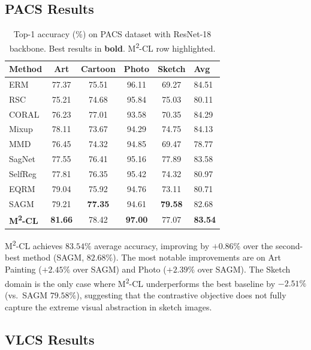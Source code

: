 \documentclass[12pt,a4paper]{article}
\newcommand{\tablehl}{\rowcolor{LightBlue!50}}
\begin{document}
\subsection{PACS Results}

\begin{table}[H]
  \centering
  \caption{Top-1 accuracy (\%) on PACS dataset with ResNet-18 backbone.
  Best results in \textbf{bold}. M\textsuperscript{2}-CL row highlighted.}
  \label{tab:pacs}
  \begin{tabular}{@{}lccccC{1.3cm}@{}}
    \toprule
    \textbf{Method} & \textbf{Art} & \textbf{Cartoon} & \textbf{Photo}
      & \textbf{Sketch} & \textbf{Avg} \\
    \midrule
    ERM       & 77.37 & 75.51 & 96.11 & 69.27 & 84.51 \\
    RSC       & 75.21 & 74.68 & 95.84 & 75.03 & 80.11 \\
    CORAL     & 76.23 & 77.01 & 93.58 & 70.35 & 84.29 \\
    Mixup     & 78.11 & 73.67 & 94.29 & 74.75 & 84.13 \\
    MMD       & 76.45 & 74.32 & 94.85 & 69.47 & 78.77 \\
    SagNet    & 77.55 & 76.41 & 95.16 & 77.89 & 83.58 \\
    SelfReg   & 77.81 & 76.35 & 95.42 & 74.32 & 80.97 \\
    EQRM      & 79.04 & 75.92 & 94.76 & 73.11 & 80.71 \\
    SAGM      & 79.21 & \textbf{77.35} & 94.61 & \textbf{79.58} & 82.68 \\
    \midrule
    \tablehl
    \textbf{M\textsuperscript{2}-CL} & \textbf{81.66} & {78.42} & \textbf{97.00}
      & 77.07 & \textbf{83.54} \\
    \bottomrule
  \end{tabular}
\end{table}

M\textsuperscript{2}-CL achieves $83.54\%$ average accuracy, improving by $+0.86\%$
over the second-best method (SAGM, $82.68\%$). The most notable improvements are on
Art Painting ($+2.45\%$ over SAGM) and Photo ($+2.39\%$ over SAGM). The Sketch domain
is the only case where M\textsuperscript{2}-CL underperforms the best baseline by $-2.51\%$
(vs.\ SAGM $79.58\%$), suggesting that the contrastive objective does not fully capture
the extreme visual abstraction in sketch images.

\subsection{VLCS Results}
\end{document}
